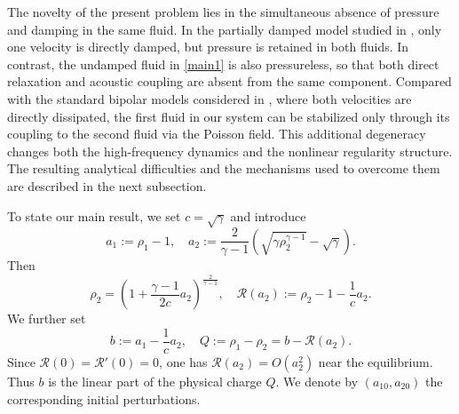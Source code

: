 \documentclass[10pt,reqno]{amsart}
\numberwithin{equation}{section}
\begin{document}
The novelty of the present problem lies in the simultaneous absence of pressure and damping in the same fluid. In the partially damped model studied in \cite{ZZ19}, only one velocity is directly damped, but pressure is retained in both fluids. In contrast, the undamped fluid in \eqref{main1} is also pressureless, so that both direct relaxation and acoustic coupling are absent from the same component. Compared with the standard bipolar models considered in \cite{AJ03,LY12,WW14}, where both velocities are directly dissipated, the first fluid in our system can be stabilized only through its coupling to the second fluid via the Poisson field. This additional degeneracy changes both the high-frequency dynamics and the nonlinear regularity structure. The resulting analytical difficulties and the mechanisms used to overcome them are described in the next subsection.




To state our main result, we set $c=\sqrt\gamma$ and introduce
\begin{equation}\label{newvariable}
a_1 :=\rho_1-1,\quad a_2 := \frac{2}{\gamma-1} \left(\sqrt{\gamma\rho_2^{\gamma-1}}-\sqrt\gamma\right).
\end{equation}
Then
\[
\rho_2 =\left(1+\frac{\gamma-1}{2c}a_2\right)^{\frac{2}{\gamma-1}}, \quad \mathcal R(a_2):=\rho_2-1-\frac1c a_2.
\]
We further set
\[
b:=a_1-\frac1c a_2, \quad Q:=\rho_1-\rho_2=b-\mathcal R(a_2).
\]
Since $\mathcal R(0)=\mathcal R'(0)=0$, one has $\mathcal R(a_2)=O(a_2^2)$ near the equilibrium. Thus $b$ is the linear part of the physical charge $Q$. We denote by $(a_{10},a_{20})$ the corresponding initial perturbations.
\end{document}

